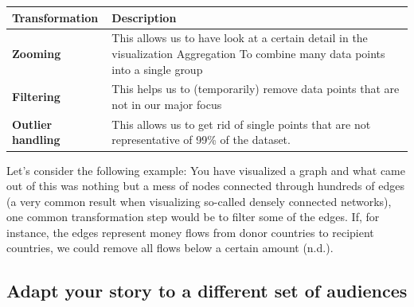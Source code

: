 \documentclass[]{book}
\begin{document}
\begin{longtable}[]{@{}ll@{}}
\toprule
\begin{minipage}[b]{0.16\columnwidth}\raggedright\strut
\textbf{Transformation}\strut
\end{minipage} & \begin{minipage}[b]{0.78\columnwidth}\raggedright\strut
\textbf{Description}\strut
\end{minipage}\tabularnewline
\midrule
\endhead
\begin{minipage}[t]{0.16\columnwidth}\raggedright\strut
\textbf{Zooming}\strut
\end{minipage} & \begin{minipage}[t]{0.78\columnwidth}\raggedright\strut
This allows us to have look at a certain detail in the visualization
Aggregation To combine many data points into a single group\strut
\end{minipage}\tabularnewline
\begin{minipage}[t]{0.16\columnwidth}\raggedright\strut
\textbf{Filtering}\strut
\end{minipage} & \begin{minipage}[t]{0.78\columnwidth}\raggedright\strut
This helps us to (temporarily) remove data points that are not in our
major focus\strut
\end{minipage}\tabularnewline
\begin{minipage}[t]{0.16\columnwidth}\raggedright\strut
\textbf{Outlier handling}\strut
\end{minipage} & \begin{minipage}[t]{0.78\columnwidth}\raggedright\strut
This allows us to get rid of single points that are not representative
of 99\% of the dataset.\strut
\end{minipage}\tabularnewline
\bottomrule
\end{longtable}

Let's consider the following example: You have visualized a graph and
what came out of this was nothing but a mess of nodes connected through
hundreds of edges (a very common result when visualizing so-called
densely connected networks), one common transformation step would be to
filter some of the edges. If, for instance, the edges represent money
flows from donor countries to recipient countries, we could remove all
flows below a certain amount (n.d.).

\subsection{Adapt your story to a different set of
audiences}\label{adapt-your-story-to-a-different-set-of-audiences}
\end{document}
